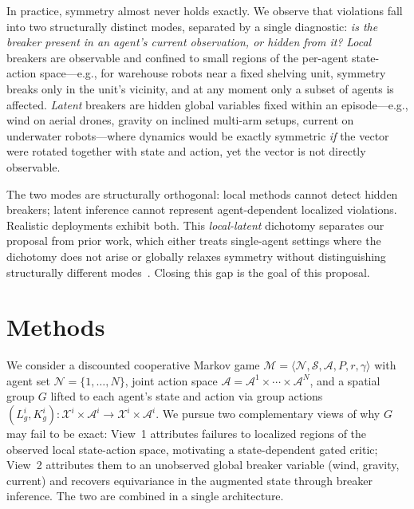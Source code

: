 \documentclass[11pt]{article}
\begin{document}
In practice, symmetry almost never holds exactly. We observe that violations fall into two structurally distinct modes, separated by a single diagnostic: \emph{is the breaker present in an agent's current observation, or hidden from it?} \emph{Local} breakers are observable and confined to small regions of the per-agent state-action space—e.g., for warehouse robots near a fixed shelving unit, symmetry breaks only in the unit's vicinity, and at any moment only a subset of agents is affected. \emph{Latent} breakers are hidden global variables fixed within an episode—e.g., wind on aerial drones, gravity on inclined multi-arm setups, current on underwater robots—where dynamics would be exactly symmetric \emph{if} the vector were rotated together with state and action, yet the vector is not directly observable.

The two modes are structurally orthogonal: local methods cannot detect hidden breakers; latent inference cannot represent agent-dependent localized violations. Realistic deployments exhibit both. This \emph{local-latent} dichotomy separates our proposal from prior work, which either treats single-agent settings where the dichotomy does not arise or globally relaxes symmetry without distinguishing structurally different modes~\citep{finzi2021rpp,wang2022approx,romero2022partial,vanderouderaa2022relaxing,hofgard2024relaxed,park2025approximate}. Closing this gap is the goal of this proposal.

\section{Methods}
We consider a discounted cooperative Markov game $\mathcal{M} = \langle \mathcal{N}, \mathcal{S}, \mathcal{A}, P, r, \gamma\rangle$ with agent set $\mathcal{N} = \{1, \dots, N\}$, joint action space $\mathcal{A} = \mathcal{A}^1 \times \cdots \times \mathcal{A}^N$, and a spatial group $G$ lifted to each agent's state and action via group actions $(L_g^i, K_g^i)\colon \mathcal{X}^i \times \mathcal{A}^i \to \mathcal{X}^i \times \mathcal{A}^i$. We pursue two complementary views of why $G$ may fail to be exact: View~1 attributes failures to localized regions of the observed local state-action space, motivating a state-dependent gated critic; View~2 attributes them to an unobserved global breaker variable (wind, gravity, current) and recovers equivariance in the augmented state through breaker inference. The two are combined in a single architecture.
\end{document}
